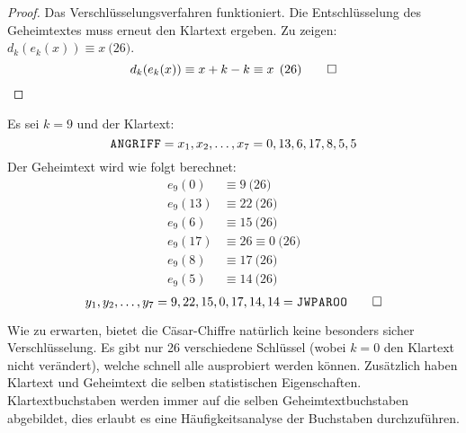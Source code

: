 \noindent
\begin{proof}
  Das Verschlüsselungsverfahren funktioniert.
  Die Entschlüsselung des Geheimtextes muss erneut den Klartext ergeben.
  Zu zeigen: $d_k(e_k(x)) \equiv x \pod{26}$.
  \begin{equation*}
    d_k(e_k(x)) \equiv x + k - k \equiv x \pod{26} \qedhere
  \end{equation*}
\end{proof}
\begin{example}
  Es sei $k = 9$ und der Klartext:
  \begin{equation*}
    \text{\texttt{A\kern 0.2mmN\kern 0.2mmG\kern 0.2mmR\kern 0.2mmI\kern 0.2mmF\kern 0.2mmF}}
    = x_1,x_2,\dots,x_7 = 0,13,6,17,8,5,5
  \end{equation*}
  Der Geheimtext wird wie folgt berechnet:
  \begin{align*}
    e_9(0)  & \equiv 9 \pod{26}           \\
    e_9(13) & \equiv 22 \pod{26}          \\
    e_9(6)  & \equiv 15 \pod{26}          \\
    e_9(17) & \equiv 26 \equiv 0 \pod{26} \\
    e_9(8)  & \equiv 17 \pod{26}          \\
    e_9(5)  & \equiv 14 \pod{26}
  \end{align*}
  \begin{equation*}
    y_1,y_2,\dots,y_7 = 9,22,15,0,17,14,14 =
    \text{\texttt{J\kern 0.2mmW\kern 0.2mmP\kern 0.2mmA\kern 0.2mmR\kern 0.2mmO\kern 0.2mmO}} \qedhere
  \end{equation*}
\end{example}

\noindent
Wie zu erwarten, bietet die Cäsar-Chiffre natürlich keine besonders sicher Verschlüs\-selung.
Es gibt nur 26 verschiedene Schlüssel (wobei $k = 0$ den Klartext nicht verändert),
welche schnell alle ausprobiert werden können. Zusätzlich
haben Klartext und Geheimtext die selben statistischen Eigenschaften.
Klartextbuchstaben werden immer auf die selben Geheimtextbuchstaben abgebildet, dies
erlaubt es eine Häufigkeitsanalyse der Buchstaben durchzuführen.